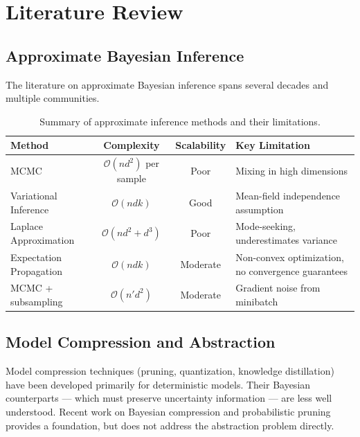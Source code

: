 \documentclass[
    language=english,
    doctype=dissertation-proposal,
    institution=none,
]{../../omnilatex}
\begin{document}
\section{Literature Review}
\label{sec:literature}

\subsection{Approximate Bayesian Inference}

The literature on approximate Bayesian inference spans several decades and
multiple communities.

\begin{table}[htbp]
    \centering
    \caption{Summary of approximate inference methods and their limitations.}
    \label{tab:inference-methods}
    \begin{tabular}{@{}lccp{5cm}@{}}
        \toprule
        Method & Complexity & Scalability & Key Limitation \\
        \midrule
        MCMC & $\mathcal{O}(nd^2)$ per sample & Poor & Mixing in high dimensions \\
        Variational Inference & $\mathcal{O}(ndk)$ & Good & Mean-field independence assumption \\
        Laplace Approximation & $\mathcal{O}(nd^2 + d^3)$ & Poor & Mode-seeking, underestimates variance \\
        Expectation Propagation & $\mathcal{O}(ndk)$ & Moderate & Non-convex optimization, no convergence guarantees \\
        MCMC + subsampling & $\mathcal{O}(n' d^2)$ & Moderate & Gradient noise from minibatch \\
        \bottomrule
    \end{tabular}
\end{table}

\subsection{Model Compression and Abstraction}

Model compression techniques (pruning, quantization, knowledge distillation)
have been developed primarily for deterministic models. Their Bayesian
counterparts --- which must preserve uncertainty information --- are less
well understood. Recent work on Bayesian compression \cite{blundell2015weight}
and probabilistic pruning provides a foundation, but does not address the
abstraction problem directly.
\end{document}
